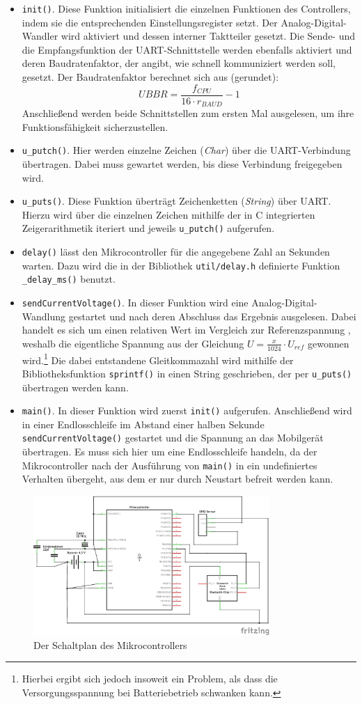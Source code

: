 \begin{itemize}
\item \texttt{init()}. Diese Funktion initialisiert die einzelnen Funktionen des Controllers, indem sie die entsprechenden Einstellungsregister \cite{Src:AtmelDBeins} setzt. Der Analog-Digital-Wandler wird aktiviert und dessen interner Taktteiler gesetzt. Die Sende- und die Empfangsfunktion der UART-Schnittstelle werden ebenfalls aktiviert und deren Baudratenfaktor, der angibt, wie schnell kommuniziert werden soll, gesetzt.
Der Baudratenfaktor \cite{Src:AtmelDBeins} berechnet sich aus (gerundet): \[UBBR = \frac{f_{CPU}}{16 \cdot r_{BAUD}} - 1 \]
Anschließend werden beide Schnittstellen zum ersten Mal ausgelesen, um ihre Funktionsfähigkeit sicherzustellen.
\item \texttt{u\_putch()}. Hier werden einzelne Zeichen (\textit{Char}) über die UART-Verbindung übertragen. Dabei muss gewartet werden, bis diese Verbindung freigegeben wird.
\item \texttt{u\_puts()}. Diese Funktion überträgt Zeichenketten (\textit{String}) über UART. Hierzu wird über die einzelnen Zeichen mithilfe der in C integrierten Zeigerarithmetik iteriert und jeweils \texttt{u\_putch()} aufgerufen.
\item \texttt{delay()} lässt den Mikrocontroller für die angegebene Zahl an Sekunden warten. Dazu wird die in der Bibliothek \texttt{util/delay.h} definierte Funktion \texttt{\_delay\_ms()} benutzt.
\item \texttt{sendCurrentVoltage()}. In dieser Funktion wird eine Analog-Digital-Wandlung gestartet und nach deren Abschluss das Ergebnis ausgelesen. Dabei handelt es sich um einen relativen Wert im Vergleich zur Referenzspannung \cite{Src:AVRTutor}, weshalb die eigentliche Spannung aus der Gleichung $U = \frac{x}{1024} \cdot U_{ref}$ gewonnen wird.\footnote{Hierbei ergibt sich jedoch insoweit ein Problem, als dass die Versorgungsspannung bei Batteriebetrieb schwanken kann.} Die dabei entstandene Gleitkommazahl wird mithilfe der Bibliotheksfunktion \texttt{sprintf()} in einen String geschrieben, der per \texttt{u\_puts()} übertragen werden kann.
\item \texttt{main()}. In dieser Funktion wird zuerst \texttt{init()} aufgerufen. Anschließend wird in einer Endlosschleife im Abstand einer halben Sekunde \texttt{sendCurrentVoltage()} gestartet und die Spannung an das Mobilgerät übertragen. Es muss sich hier um eine Endlosschleife handeln, da der Mikrocontroller nach der Ausführung von \texttt{main()} in ein undefiniertes Verhalten übergeht, aus dem er nur durch Neustart befreit werden kann.
\end{itemize}
\begin{figure}[H]
\centering
\includegraphics[width=0.8\textwidth]{pics/mikrocontroller_schaltplan.png}
\caption{Der Schaltplan des Mikrocontrollers}
\label{fig:mikrocontroller}
\end{figure}